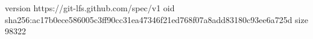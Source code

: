 version https://git-lfs.github.com/spec/v1
oid sha256:ac17b0ece586005c3ff90cc31ea47346f21ed768f07a8add83180c93ee6a725d
size 98322
